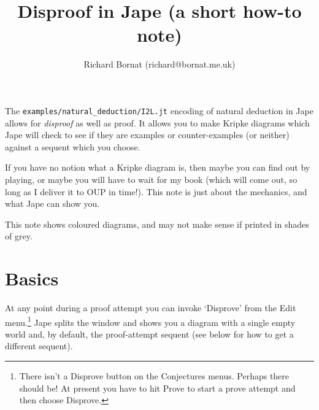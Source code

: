 \documentclass[11pt]{article}
\title{Disproof in Jape (a short how-to note)}
\author{Richard Bornat (richard@bornat.me.uk)}
\begin{document}
\maketitle

The \texttt{examples/natural\_deduction/I2L.jt} encoding of natural deduction in Jape allows for \emph{disproof} as well as proof. It allows you to make Kripke diagrams which Jape will check to see if they are examples or counter-examples (or neither) against a sequent which you choose.

If you have no notion what a Kripke diagram is, then maybe you can find out by playing, or maybe you will have to wait for my book (which will come out, so long as I deliver it to OUP in time!). This note is just about the mechanics, and what Jape can show you.

This note shows coloured diagrams, and may not make sense if printed in shades of grey.

\section{Basics}

At any point during a proof attempt you can invoke `Disprove' from the Edit menu.\footnote{There isn't a Disprove button on the Conjectures menus. Perhaps there should be! At present you have to hit Prove to start a prove attempt and then choose Disprove.} Jape splits the window and shows you a diagram with a single empty world and, by default, the proof-attempt sequent (see below for how to get a different sequent).
\end{document}
